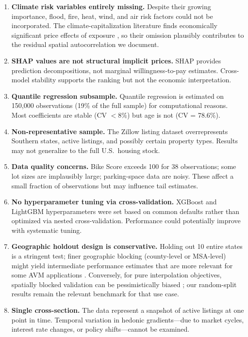 \begin{enumerate}[nosep]
    \item \textbf{Climate risk variables entirely missing.} Despite their growing importance, flood, fire, heat, wind, and air risk factors could not be incorporated. The climate-capitalization literature finds economically significant price effects of exposure \citep{baldauf2020does, bernstein2019disaster, murfin2020risk}, so their omission plausibly contributes to the residual spatial autocorrelation we document.

    \item \textbf{SHAP values are not structural implicit prices.} SHAP provides prediction decompositions, not marginal willingness-to-pay estimates. Cross-model stability supports the ranking but not the economic interpretation.

    \item \textbf{Quantile regression subsample.} Quantile regression is estimated on 150,000 observations (19\% of the full sample) for computational reasons. Most coefficients are stable (CV $< 8\%$) but age is not (CV = 78.6\%).

    \item \textbf{Non-representative sample.} The Zillow listing dataset overrepresents Southern states, active listings, and possibly certain property types. Results may not generalize to the full U.S.\ housing stock.

    \item \textbf{Data quality concerns.} Bike Score exceeds 100 for 38 observations; some lot sizes are implausibly large; parking-space data are noisy. These affect a small fraction of observations but may influence tail estimates.

    \item \textbf{No hyperparameter tuning via cross-validation.} XGBoost and LightGBM hyperparameters were set based on common defaults rather than optimized via nested cross-validation. Performance could potentially improve with systematic tuning.

    \item \textbf{Geographic holdout design is conservative.} Holding out 10 entire states is a stringent test; finer geographic blocking (county-level or MSA-level) might yield intermediate performance estimates that are more relevant for some AVM applications \citep{valavi2019blockcv}. Conversely, for pure interpolation objectives, spatially blocked validation can be pessimistically biased \citep{wadoux2021spatial}; our random-split results remain the relevant benchmark for that use case.

    \item \textbf{Single cross-section.} The data represent a snapshot of active listings at one point in time. Temporal variation in hedonic gradients---due to market cycles, interest rate changes, or policy shifts---cannot be examined.
\end{enumerate}
